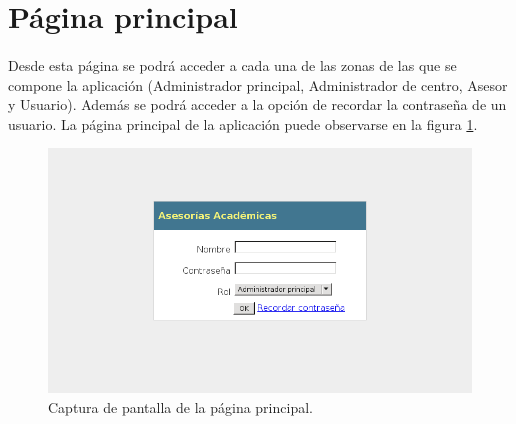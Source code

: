 \section{Página principal}

  \paragraph{}Desde esta página se podrá acceder a cada una de las zonas de las
  que se compone la aplicación (Administrador principal, Administrador de
  centro, Asesor y Usuario). Además se podrá acceder a la opción de recordar la
  contraseña de un usuario. La página principal de la aplicación puede
  observarse en la figura \ref{capturaPaginaPrincipal}.

  \begin{figure}[!ht]
    \begin{center}
      \includegraphics[scale=0.7]{12.Disenyo_Interfaz/12.2.Pagina_Principal/pagina_principal.png}
      \caption{Captura de pantalla de la página principal.}
      \label{capturaPaginaPrincipal}
    \end{center}
  \end{figure}
